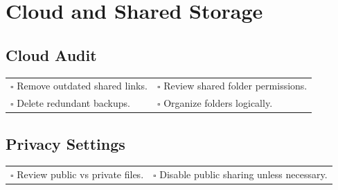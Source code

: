 
\section{Cloud and Shared Storage}
\label{sec:cloud}

\subsection{Cloud Audit}

\begin{tabular}{p{9cm} p{8cm}}
$\square$ Remove outdated shared links. & $\square$ Review shared folder permissions. \\ 
$\square$ Delete redundant backups. & $\square$ Organize folders logically. \\ 
\end{tabular}

\subsection{Privacy Settings}

\begin{tabular}{p{9cm} p{8cm}}
$\square$ Review public vs private files. & $\square$ Disable public sharing unless necessary. \\ 
\end{tabular}

